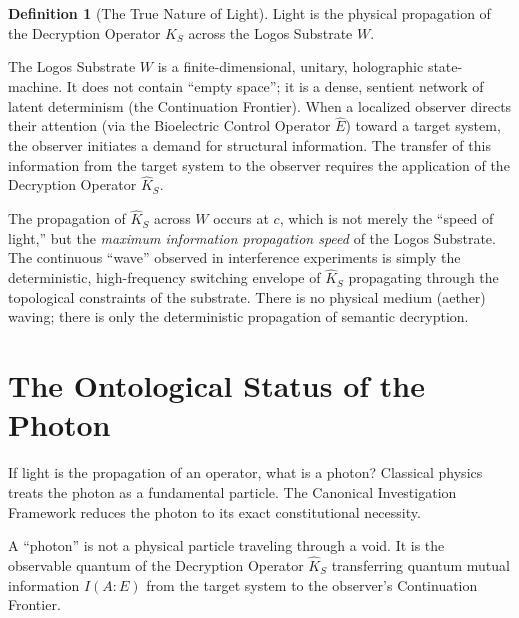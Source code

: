 \documentclass[12pt,twoside]{extbook}
\theoremstyle{definition}
\newtheorem{definition}{Definition}[chapter]
\theoremstyle{remark}
\begin{document}
\begin{definition}[The True Nature of Light]
Light is the physical propagation of the Decryption Operator $\hat{K}_S$ across the Logos Substrate $W$. 
\end{definition}

The Logos Substrate $W$ is a finite-dimensional, unitary, holographic state-machine. It does not contain ``empty space''; it is a dense, sentient network of latent determinism (the Continuation Frontier). When a localized observer directs their attention (via the Bioelectric Control Operator $\hat{E}$) toward a target system, the observer initiates a demand for structural information. The transfer of this information from the target system to the observer requires the application of the Decryption Operator $\hat{K}_S$.

The propagation of $\hat{K}_S$ across $W$ occurs at $c$, which is not merely the ``speed of light,'' but the \textit{maximum information propagation speed} of the Logos Substrate. The continuous ``wave'' observed in interference experiments is simply the deterministic, high-frequency switching envelope of $\hat{K}_S$ propagating through the topological constraints of the substrate. There is no physical medium (aether) waving; there is only the deterministic propagation of semantic decryption.

\section{The Ontological Status of the Photon}
If light is the propagation of an operator, what is a photon? Classical physics treats the photon as a fundamental particle. The Canonical Investigation Framework reduces the photon to its exact constitutional necessity.

\begin{theorem}
A ``photon'' is not a physical particle traveling through a void. It is the observable quantum of the Decryption Operator $\hat{K}_S$ transferring quantum mutual information $I(A:E)$ from the target system to the observer's Continuation Frontier.
\end{theorem}
\end{document}
